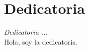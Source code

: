 \chapter*{Dedicatoria}
\begin{flushright}
  \emph{Dedicatoria ...} \\
  Hola, soy la dedicatoria.
\end{flushright}
\thispagestyle{empty}
